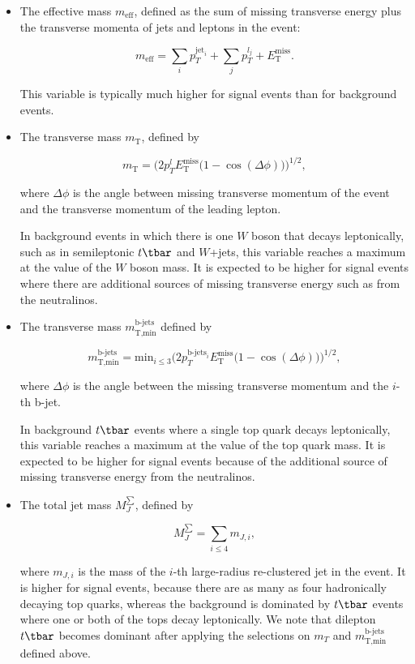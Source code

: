 \begin{itemize}

	\item The effective mass $m_{\text{eff}}$, defined as the sum of missing
	      transverse energy plus the transverse momenta of jets and leptons in the event:

	      $$m_{\text{eff}} = \sum_i p_T^{\text{jet}_i} + \sum_j p_T^{l_j} +
		      E_{\text{T}}^{\text{miss}}.$$

	      This variable is typically much higher for signal events than for background events.


	\item The transverse mass $m_{\text{T}}$, defined by

	      $$m_{\text{T}} = \bigg(2p_T^l E_{\text{T}}^{\text{miss}} \big(1 -
		      \cos(\Delta\phi) \big) \bigg)^{1/2},$$

	      where $\Delta \phi$ is the angle between missing transverse momentum of the
	      event and the transverse momentum of the leading lepton.

	      In background events in which there is one $W$ boson that decays leptonically,
	      such as in semileptonic $t\tbar$ and $W$+jets, this variable reaches a
	      maximum at the value of the $W$ boson mass. It is expected to be higher for
	      signal events where there are additional sources of missing transverse
	      energy such as from the neutralinos.


	\item The transverse mass $m_{\text{T,min}}^{\text{b-jets}}$ defined by

	      $$m_{\text{T,min}}^{\text{b-jets}} = \text{min}_{i\leq 3} \bigg(2
		      p_T^{\text{b-jets}_i} E_{\text{T}}^{\text{miss}} \big( 1 -
		      \cos(\Delta\phi)\big) \bigg)^{1/2},$$

	      where $\Delta \phi$ is the angle between the missing transverse momentum and
	      the $i$-th b-jet.

	      In background $t\tbar$ events where a single top quark decays leptonically,
	      this variable reaches a maximum at the value of the top quark mass. It is
	      expected to be higher for signal events because of the additional source of
	      missing transverse energy from the neutralinos.

	\item The total jet mass $M_J^{\sum}$, defined by

	      $$M_J^{\sum} = \sum_{i\leq 4}m_{J, i}, $$

	      where $m_{J, i}$ is the mass of the $i$-th large-radius re-clustered jet in the
	      event. It is higher for signal events, because there are as many as four
	      hadronically decaying top quarks, whereas the background is dominated by
	      $t\tbar$ events where one or both of the tops decay leptonically. We note that
	      dilepton $t\tbar$ becomes dominant after applying the selections on $m_T$ and
	      $m_{\text{T,min}}^{\text{b-jets}}$ defined above.

\end{itemize}


